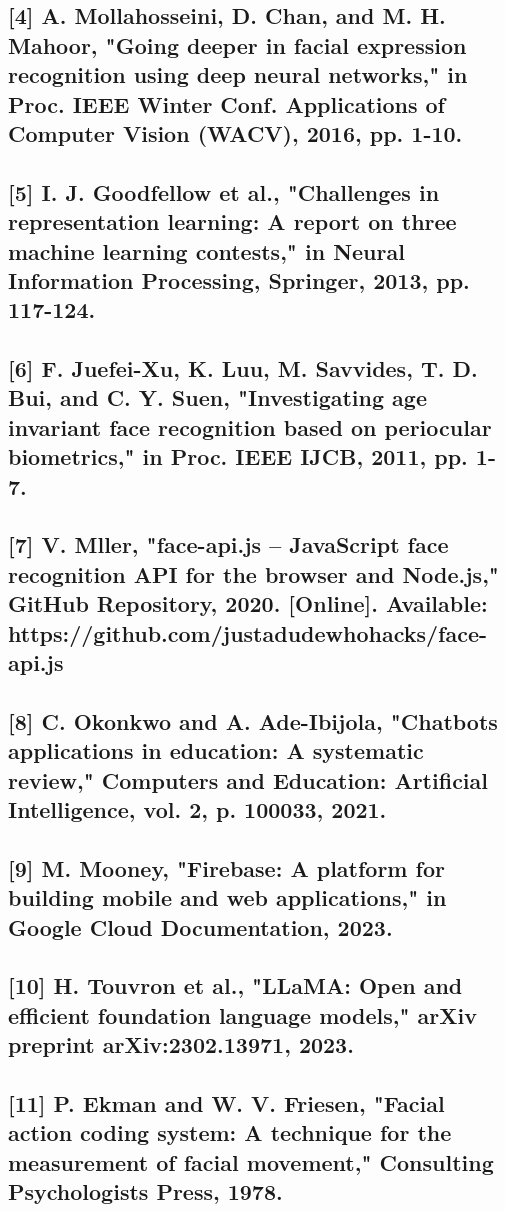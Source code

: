 \documentclass[conference]{IEEEtran}
\begin{document}
\subsection{[4] A. Mollahosseini, D. Chan, and M. H. Mahoor, "Going deeper in facial expression recognition using deep neural networks," in Proc. IEEE Winter Conf. Applications of Computer Vision (WACV), 2016, pp. 1-10.}
\subsection{[5] I. J. Goodfellow et al., "Challenges in representation learning: A report on three machine learning contests," in Neural Information Processing, Springer, 2013, pp. 117-124.}
\subsection{[6] F. Juefei-Xu, K. Luu, M. Savvides, T. D. Bui, and C. Y. Suen, "Investigating age invariant face recognition based on periocular biometrics," in Proc. IEEE IJCB, 2011, pp. 1-7.}
\subsection{[7] V. Mller, "face-api.js – JavaScript face recognition API for the browser and Node.js," GitHub Repository, 2020. [Online]. Available: https://github.com/justadudewhohacks/face-api.js}
\subsection{[8] C. Okonkwo and A. Ade-Ibijola, "Chatbots applications in education: A systematic review," Computers and Education: Artificial Intelligence, vol. 2, p. 100033, 2021.}
\subsection{[9] M. Mooney, "Firebase: A platform for building mobile and web applications," in Google Cloud Documentation, 2023.}
\subsection{[10] H. Touvron et al., "LLaMA: Open and efficient foundation language models," arXiv preprint arXiv:2302.13971, 2023.}
\subsection{[11] P. Ekman and W. V. Friesen, "Facial action coding system: A technique for the measurement of facial movement," Consulting Psychologists Press, 1978.}
\end{document}
